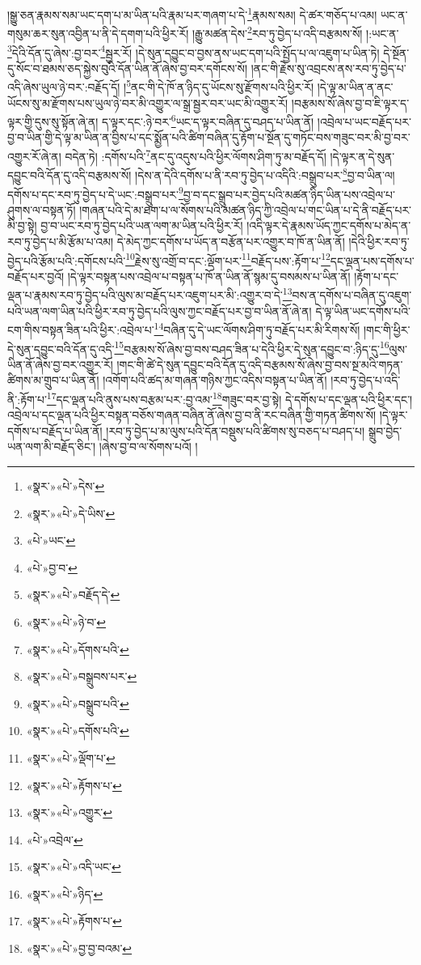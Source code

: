 །སྒྱུ་ཅན་རྣམས་སམ་ཡང་དག་པ་མ་ཡིན་པའི་རྣམ་པར་གཞག་པ་དེ་\footnote{«སྣར་»«པེ་»དེས་}རྣམས་སམ། དེ་ཚར་གཅོད་པ་འམ། ཡང་ན་གསུམ་ཆར་སུན་འབྱིན་པ་ནི་དེ་དགག་པའི་ཕྱིར་རོ། །རྒྱུ་མཚན་དེས་\footnote{«སྣར་»«པེ་»དེ་ཡིས་}རབ་ཏུ་བྱེད་པ་འདི་བརྩམས་སོ། །:ཡང་ན་\footnote{«པེ་»ཡང་}དེའི་དོན་དུ་ཞེས་:བྱ་བར་\footnote{«པེ་»བྱ་བ་}སྦྱར་རོ། །དེ་སུན་དབྱུང་བ་བྱས་ནས་ཡང་དག་པའི་སྤྱོད་པ་ལ་འཇུག་པ་ཡིན་ཏེ། དེ་སྔོན་དུ་སོང་བ་ཐམས་ཅད་སྐྱེས་བུའི་དོན་ཡིན་ནོ་ཞེས་བྱ་བར་དགོངས་སོ། །ནང་གི་རྗེས་སུ་འབྲངས་ནས་རབ་ཏུ་བྱེད་པ་འདི་ཞེས་ཡུལ་ཉེ་བར་:བརྗོད་དོ། །\footnote{«སྣར་»«པེ་»བརྗོད་དེ་}ནང་གི་དེ་ཁོ་ན་ཉིད་དུ་ཡོངས་སུ་རྫོགས་པའི་ཕྱིར་རོ། །དེ་ལྟ་མ་ཡིན་ན་ནང་ཡོངས་སུ་མ་རྫོགས་པས་ཡུལ་ཉེ་བར་མི་འགྱུར་ལ་སྒྲ་སྦྱར་བར་ཡང་མི་འགྱུར་རོ། །བརྩམས་སོ་ཞེས་བྱ་བ་ཇི་ལྟར་ད་ལྟར་གྱི་དུས་སུ་སྟོན་ཞེ་ན། ད་ལྟར་དང་:ཉེ་བར་\footnote{«སྣར་»«པེ་»ཉེ་བ་}ཡང་ད་ལྟར་བཞིན་དུ་བཤད་པ་ཡིན་ནོ། །འབྲེལ་པ་ཡང་བརྗོད་པར་བྱ་བ་ཡིན་གྱི་དེ་ལྟ་མ་ཡིན་ན་བྱིས་པ་དང་སྨྱོན་པའི་ཚིག་བཞིན་དུ་རྟོག་པ་སྔོན་དུ་གཏོང་བས་གཟུང་བར་མི་བྱ་བར་འགྱུར་རོ་ཞེ་ན། བདེན་ཏེ། :དགོས་པའི་\footnote{«སྣར་»«པེ་»དོགས་པའི་}ནང་དུ་འདུས་པའི་ཕྱིར་ལོགས་ཤིག་ཏུ་མ་བརྗོད་དོ། །དེ་ལྟར་ན་དེ་སུན་དབྱུང་བའི་དོན་དུ་འདི་བརྩམས་སོ། །དེས་ན་དེའི་དགོས་པ་ནི་རབ་ཏུ་བྱེད་པ་འདིའི་:བསྒྲུབ་པར་\footnote{«སྣར་»«པེ་»བསྒྲུབས་པར་}བྱ་བ་ཡིན་ལ། དགོས་པ་དང་རབ་ཏུ་བྱེད་པ་དེ་ཡང་:བསྒྲུབ་པར་\footnote{«སྣར་»«པེ་»བསྒྲུབ་པའི་}བྱ་བ་དང་སྒྲུབ་པར་བྱེད་པའི་མཚན་ཉིད་ཡིན་པས་འབྲེལ་པ་ཤུགས་ལ་བསྟན་ཏོ། །གཞན་པའི་དེ་མ་ཐག་པ་ལ་སོགས་པའི་མཚན་ཉིད་ཀྱི་འབྲེལ་པ་གང་ཡིན་པ་དེ་ནི་བརྗོད་པར་མི་བྱ་སྟེ། བྱ་བ་ཡང་རབ་ཏུ་བྱེད་པའི་ཡན་ལག་མ་ཡིན་པའི་ཕྱིར་རོ། །འདི་ལྟར་དེ་རྣམས་ཡོད་ཀྱང་དགོས་པ་མེད་ན་རབ་ཏུ་བྱེད་པ་མི་རྩོམ་པ་འམ། དེ་མེད་ཀྱང་དགོས་པ་ཡོད་ན་བརྩོན་པར་འགྱུར་བ་ཁོ་ན་ཡིན་ནོ། །དེའི་ཕྱིར་རབ་ཏུ་བྱེད་པའི་རྩོམ་པའི་:དགོངས་པའི་\footnote{«སྣར་»«པེ་»དགོས་པའི་}རྗེས་སུ་འགྲོ་བ་དང་:ལྡོག་པར་\footnote{«སྣར་»«པེ་»ལྡོག་པ་}བརྗོད་པས་:རྟོག་པ་\footnote{«སྣར་»«པེ་»རྟོགས་པ་}དང་ལྡན་པས་དགོས་པ་བརྗོད་པར་བྱའོ། །དེ་ལྟར་བསྟན་པས་འབྲེལ་པ་བསྟན་པ་ཁོ་ན་ཡིན་ནོ་སྙམ་དུ་བསམས་པ་ཡིན་ནོ། །རྟོག་པ་དང་ལྡན་པ་རྣམས་རབ་ཏུ་བྱེད་པའི་ལུས་མ་བརྗོད་པར་འཇུག་པར་མི་:འགྱུར་བ་དེ་\footnote{«སྣར་»«པེ་»འགྱུར་}བས་ན་དགོས་པ་བཞིན་དུ་འཇུག་པའི་ཡན་ལག་ཡིན་པའི་ཕྱིར་རབ་ཏུ་བྱེད་པའི་ལུས་ཀྱང་བརྗོད་པར་བྱ་བ་ཡིན་ནོ་ཞེ་ན། དེ་ལྟ་ཡིན་ཡང་དགོས་པའི་ངག་གིས་བསྟན་ཟིན་པའི་ཕྱིར་:འབྲེལ་པ་\footnote{«པེ་»འབྲེལ་}བཞིན་དུ་དེ་ཡང་ལོགས་ཤིག་ཏུ་བརྗོད་པར་མི་རིགས་སོ། །གང་གི་ཕྱིར་དེ་སུན་དབྱུང་བའི་དོན་དུ་འདི་\footnote{«སྣར་»«པེ་»འདི་ཡང་}བརྩམས་སོ་ཞེས་བྱ་བས་བཤད་ཟིན་པ་དེའི་ཕྱིར་དེ་སུན་དབྱུང་བ་:ཉིད་དུ་\footnote{«སྣར་»«པེ་»ཉིད་}ལུས་ཡིན་ནོ་ཞེས་བྱ་བར་འགྱུར་རོ། །གང་གི་ཚེ་དེ་སུན་དབྱུང་བའི་དོན་དུ་འདི་བརྩམས་སོ་ཞེས་བྱ་བས་སྔ་མའི་གཏན་ཚིགས་མ་གྲུབ་པ་ཡིན་ནོ། །འགོག་པའི་ཚད་མ་གཞན་གཉིས་ཀྱང་འདིས་བསྟན་པ་ཡིན་ནོ། །རབ་ཏུ་བྱེད་པ་འདི་ནི་:རྟོག་པ་\footnote{«སྣར་»«པེ་»རྟོགས་པ་}དང་ལྡན་པའི་ནུས་པས་བརྩམ་པར་:བྱ་འམ་\footnote{«སྣར་»«པེ་»བྱ་བྱ་བའམ་}གཟུང་བར་བྱ་སྟེ། དེ་དགོས་པ་དང་ལྡན་པའི་ཕྱིར་དང་། འབྲེལ་པ་དང་ལྡན་པའི་ཕྱིར་བསྟན་བཅོས་གཞན་བཞིན་ནོ་ཞེས་བྱ་བ་ནི་རང་བཞིན་གྱི་གཏན་ཚིགས་སོ། །དེ་ལྟར་དགོས་པ་བརྗོད་པ་ཡིན་ནོ། །རབ་ཏུ་བྱེད་པ་མ་ལུས་པའི་དོན་བསྡུས་པའི་ཚིགས་སུ་བཅད་པ་བཤད་པ། སྒྲུབ་བྱེད་ཡན་ལག་མི་བརྗོད་ཅིང་། །ཞེས་བྱ་བ་ལ་སོགས་པའོ། །

